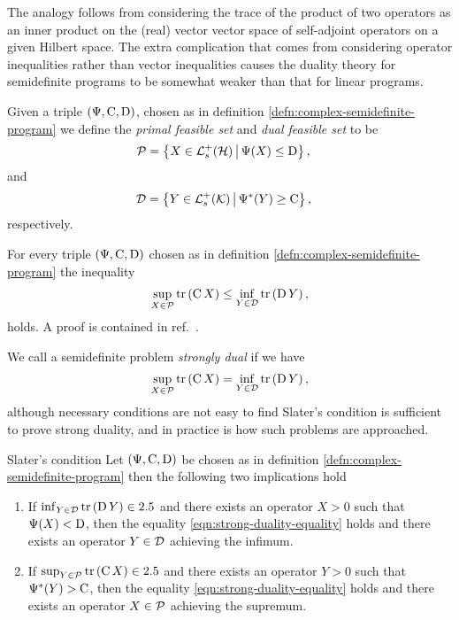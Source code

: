 The analogy follows from considering the trace of the product of two operators as an inner product on the (real) vector vector space of self-adjoint operators on a given Hilbert space. The extra complication that comes from considering operator inequalities rather than vector inequalities causes the duality theory for semidefinite programs to be somewhat weaker than that for linear programs.

\begin{defn}\label{defn:semidefinite-feasible-sets}
  Given a triple $\left(\Psi, \operatorname{C}, \operatorname{D}\right)$, chosen as in definition \ref{defn:complex-semidefinite-program} we define the \emph{primal feasible set} and \emph{dual feasible set} to be
  \begin{align}
    \pcal &= \sbuild{X\in\posops[\hcal]}{\Psi(X)\leq \opd},
  \end{align}
  and
  \begin{align}
    \dcal &= \sbuild{Y\in\posops[\kcal]}{\Psi^*(Y)\geq \opc},
  \end{align}
  respectively.
\end{defn}

\begin{thm}\label{thm:weak-duality-semidefinite-prog}
  For every triple $\left(\Psi, \operatorname{C}, \operatorname{D}\right)$ chosen as in definition \ref{defn:complex-semidefinite-program} the inequality
  \begin{align}
    \sup_{X\in\mathcal{P}} \operatorname{tr}\left( \operatorname{C} X \right) \leq \inf_{Y\in\mathcal{D}} \operatorname{tr}\left( \operatorname{D} Y \right),
  \end{align}
  holds. A proof is contained in ref.~\cite{Vandenberghe-Boyd-semidefinite}.
\end{thm}

We call a semidefinite problem \emph{strongly dual} if we have
\begin{align}\label{eqn:strong-duality-equality}
  \sup_{X\in\mathcal{P}} \operatorname{tr}\left( \operatorname{C} X \right) = \inf_{Y\in\mathcal{D}} \operatorname{tr}\left( \operatorname{D} Y \right),
\end{align}
although necessary conditions are not easy to find Slater's condition \cite{slater1950} is sufficient to prove strong duality, and in practice is how such problems are approached.
\begin{thm}{Slater's condition}\label{eqn:slaters-condition-sufficient}
  Let $\left(\Psi, \operatorname{C}, \operatorname{D}\right)$ be chosen as in definition \ref{defn:complex-semidefinite-program} then the following two implications hold
  \begin{enumerate}
  \item If $\inf_{Y\in\mathcal{D}} \operatorname{tr}\left( \operatorname{D} Y \right) \in2.5$ and there exists an operator $X> 0$ such that $\Psi(X) < \operatorname{D}$, then the equality \eqref{eqn:strong-duality-equality} holds and there exists an operator $Y\in\mathcal{D}$ achieving the infimum.
  \item If $\sup_{Y\in\mathcal{P}} \operatorname{tr}\left( \operatorname{C} X \right) \in2.5$ and there exists an operator $Y> 0$ such that $\Psi^*(Y) > \operatorname{C}$, then the equality \eqref{eqn:strong-duality-equality} holds and there exists an operator $X\in\mathcal{P}$ achieving the supremum.
  \end{enumerate}
\end{thm}

